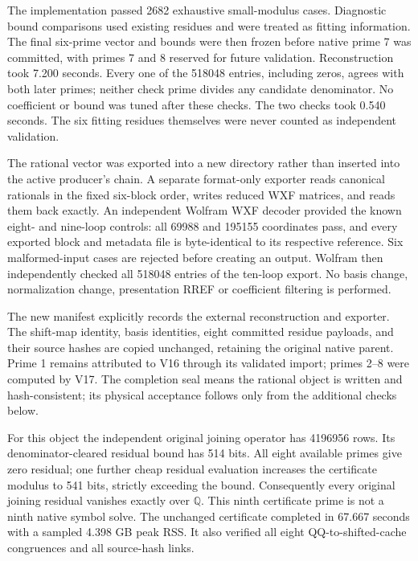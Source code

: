 \documentclass[11pt]{article}
\begin{document}
The implementation passed 2682 exhaustive small-modulus cases. Diagnostic
bound comparisons used existing residues and were treated as fitting
information. The final six-prime vector and bounds were then frozen before
native prime 7 was committed, with primes 7 and 8 reserved for future
validation. Reconstruction took 7.200 seconds. Every one of the 518048
entries, including zeros, agrees with both later primes; neither check
prime divides any candidate denominator. No coefficient or bound was tuned
after these checks. The two checks took 0.540 seconds. The six fitting
residues themselves were never counted as independent validation.

The rational vector was exported into a new directory rather than inserted
into the active producer's chain. A separate format-only exporter reads
canonical rationals in the fixed six-block order, writes reduced WXF
matrices, and reads them back exactly. An independent Wolfram WXF decoder
provided the known eight- and nine-loop controls: all 69988 and 195155
coordinates pass, and every exported block and metadata file is byte-identical
to its respective reference. Six malformed-input cases are rejected before
creating an output. Wolfram then independently checked all 518048 entries
of the ten-loop export. No basis change, normalization change, presentation
RREF or coefficient filtering is performed.

The new manifest explicitly records the external reconstruction and exporter.
The shift-map identity, basis identities, eight committed residue payloads,
and their source hashes are copied unchanged, retaining the original native
parent. Prime 1 remains attributed to V16 through its validated import;
primes 2--8 were computed by V17. The completion seal means the rational
object is written and hash-consistent; its physical acceptance follows only
from the additional checks below.

For this object the independent original joining operator has 4196956 rows.
Its denominator-cleared residual bound has 514 bits. All eight available
primes give zero residual; one further cheap residual evaluation increases
the certificate modulus to 541 bits, strictly exceeding the bound.
Consequently every original joining residual vanishes exactly over
$\mathbb Q$. This ninth certificate prime is not a ninth native symbol solve.
The unchanged certificate completed in 67.667 seconds with a sampled
4.398 GB peak RSS. It also verified all eight QQ-to-shifted-cache congruences
and all source-hash links.
\end{document}
